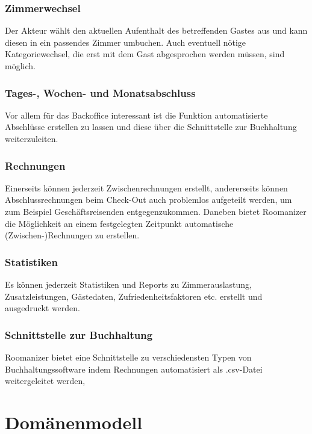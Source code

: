 \documentclass[10pt,a4paper,titlepage]{article}
\begin{document}
\subsubsection{Zimmerwechsel}
Der Akteur wählt den aktuellen Aufenthalt des betreffenden Gastes aus und kann diesen in ein passendes Zimmer umbuchen. Auch eventuell nötige Kategoriewechsel, die erst mit dem Gast abgesprochen werden müssen, sind möglich.

\subsubsection{Tages-, Wochen- und Monatsabschluss}
Vor allem für das Backoffice interessant ist die Funktion automatisierte Abschlüsse erstellen zu lassen und diese über die Schnittstelle zur Buchhaltung weiterzuleiten.

\subsubsection{Rechnungen}
Einerseits können jederzeit Zwischenrechnungen erstellt, andererseits können Abschlussrechnungen beim Check-Out auch problemlos aufgeteilt werden, um zum Beispiel Geschäftsreisenden entgegenzukommen. Daneben bietet Roomanizer die Möglichkeit an einem festgelegten Zeitpunkt automatische (Zwischen-)Rechnungen zu erstellen. 

\subsubsection{Statistiken}
Es können jederzeit Statistiken und Reports zu Zimmerauslastung, Zusatzleistungen, Gästedaten, Zufriedenheitsfaktoren etc. erstellt und ausgedruckt werden.

\subsubsection{Schnittstelle zur Buchhaltung}
Roomanizer bietet eine Schnittstelle zu verschiedensten Typen von Buchhaltungssoftware indem Rechnungen automatisiert als .csv-Datei weitergeleitet werden,

\newpage

\section{Domänenmodell}
\end{document}
